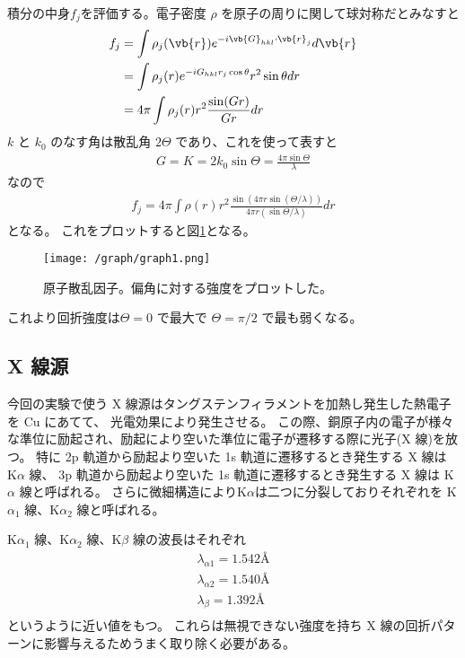 \documentclass[11pt,dvipdfmx,a4paper]{jsarticle}
\begin{document}
積分の中身\(f_j\)を評価する。電子密度 \(\rho\) を原子の周りに関して球対称だとみなすと
\begin{align}
	f_j &=\int \rho_j(\vb{r}) e^{-i\vb{G}_{hkl}\cdot \vb{r}_j} d\vb{r}\\
	&= \int \rho_j(r) e^{-iG_{hkl} r_j \cos\theta}r^2\sin\theta dr\\
	&= 4\pi \int \rho_j(r) r^2 \frac{\sin(Gr)}{Gr}dr\\
\end{align}
\(k\) と \(k_0\) のなす角は散乱角 \(2\Theta\) であり、これを使って表すと
\begin{align}
	G = K = 2k_0\sin\Theta = \frac{4\pi\sin\Theta}{\lambda}
\end{align}
なので
\begin{align}
	f_j  = 4\pi \int \rho(r) r^2 \frac{\sin(4\pi r\sin(\Theta / \lambda))}{4\pi r(\sin\Theta/\lambda)} dr
\end{align}
となる。
これをプロットすると図\ref{graph1}となる。
\begin{figure}[H]
	\centering
	\texttt{[image: /graph/graph1.png]}
	\caption{原子散乱因子。偏角に対する強度をプロットした。}
	\label{graph1}
\end{figure}
これより回折強度は\(\Theta = 0\) で最大で \(\Theta = \pi/2\) で最も弱くなる。

\subsection{X 線源}
今回の実験で使う X 線源はタングステンフィラメントを加熱し発生した熱電子を Cu にあてて、
光電効果により発生させる。
この際、銅原子内の電子が様々な準位に励起され、励起により空いた準位に電子が遷移する際に光子(X 線)を放つ。
特に
2p 軌道から励起より空いた 1s 軌道に遷移するとき発生する X 線は K\(\alpha\) 線、
3p 軌道から励起より空いた 1s 軌道に遷移するとき発生する X 線は K\(\alpha\) 線と呼ばれる。
さらに微細構造によりK\(\alpha\)は二つに分裂しておりそれぞれを
K\(\alpha_1\) 線、K\(\alpha_2\) 線と呼ばれる。

K\(\alpha_1\) 線、K\(\alpha_2\) 線、K\(\beta\) 線の波長はそれぞれ
\begin{align}
	\lambda_{\alpha1} = 1.542 \text{\AA}\\
	\lambda_{\alpha2} = 1.540 \text{\AA}\\
	\lambda_{\beta} = 1.392 \text{\AA}\\
\end{align}
というように近い値をもつ。\cite{rikanenpyo}
これらは無視できない強度を持ち X 線の回折パターンに影響与えるためうまく取り除く必要がある。
\end{document}
